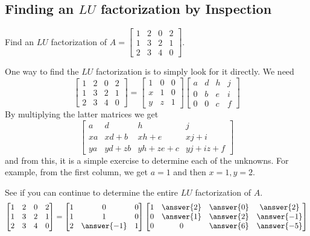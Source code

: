 \documentclass{ximera}
\begin{document}
\subsection*{Finding an $LU$ factorization by Inspection}
 
\begin{example}\label{ex:LU1}
Find an $LU$ factorization of $A=
\begin{bmatrix}
1 & 2 & 0 & 2 \\
1 & 3 & 2 & 1 \\
2 & 3 & 4 & 0
\end{bmatrix}
.$
\end{example}
 
One way to find the $LU$ factorization%
 is to simply look for it directly.
We need
\[
\begin{bmatrix}
1 & 2 & 0 & 2 \\
1 & 3 & 2 & 1 \\
2 & 3 & 4 & 0
\end{bmatrix}
=
\begin{bmatrix}
1 & 0 & 0 \\
x & 1 & 0 \\
y & z & 1
\end{bmatrix}
\begin{bmatrix}
a & d & h & j \\
0 & b & e & i \\
0 & 0 & c & f
\end{bmatrix}
\]
By multiplying the latter matrices we get
\[
\begin{bmatrix}
a & d & h & j \\
xa & xd+b & xh+e & xj+i \\
ya & yd+zb & yh+ze+c & yj+iz+f
\end{bmatrix}
\]
and from this, it is a simple exercise to determine each of the unknowns. For example, from the first
column, we get $a=1$ and then $x=1,y=2.$
 
 
See if you can continue to determine the entire $LU$
factorization of $A$.
\[
\begin{bmatrix}
1 & 2 & 0 & 2 \\
1 & 3 & 2 & 1 \\
2 & 3 & 4 & 0
\end{bmatrix}
=
\begin{bmatrix}
1 & 0 & 0 \\
1 & 1 & 0 \\
2 & \answer{-1} & 1
\end{bmatrix}
\begin{bmatrix}
1 & \answer{2} & \answer{0} & \answer{2} \\
0 & \answer{1} & \answer{2} & \answer{-1} \\
0 & 0 & \answer{6} & \answer{-5}
\end{bmatrix}
\]
\end{document}
